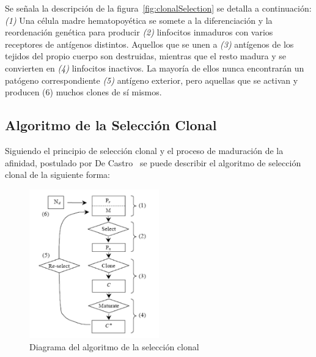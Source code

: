 Se señala la descripción de la figura~\ref{fig:clonalSelection} se detalla a continuación:
\emph{(1)} Una célula madre hematopoyética se somete a la diferenciación y
la reordenación genética para producir \emph{(2)} linfocitos inmaduros con
varios receptores de antígenos distintos.
Aquellos que se unen a \emph{(3)} antígenos de los tejidos del propio cuerpo
son destruidas, mientras que el resto madura y se convierten en \emph{(4)} linfocitos
inactivos. La mayoría de ellos nunca encontrarán un patógeno correspondiente \emph{(5)}
antígeno exterior, pero aquellas que se activan y producen (6) muchos clones de sí mismos.

\subsection{Algoritmo de la Selección Clonal}



Siguiendo el principio de selección clonal y el proceso de maduración de la afinidad, postulado por De Castro~\cite{decastro} se puede describir el algoritmo de selección clonal de la siguiente forma:
\begin{figure}[h!]
\begin{center}
\includegraphics[width=0.5\textwidth]{img/algoritmo}
\end{center}
\caption{Diagrama del algoritmo de la selección clonal}
\label{fig:algoritmo}
\end{figure}

